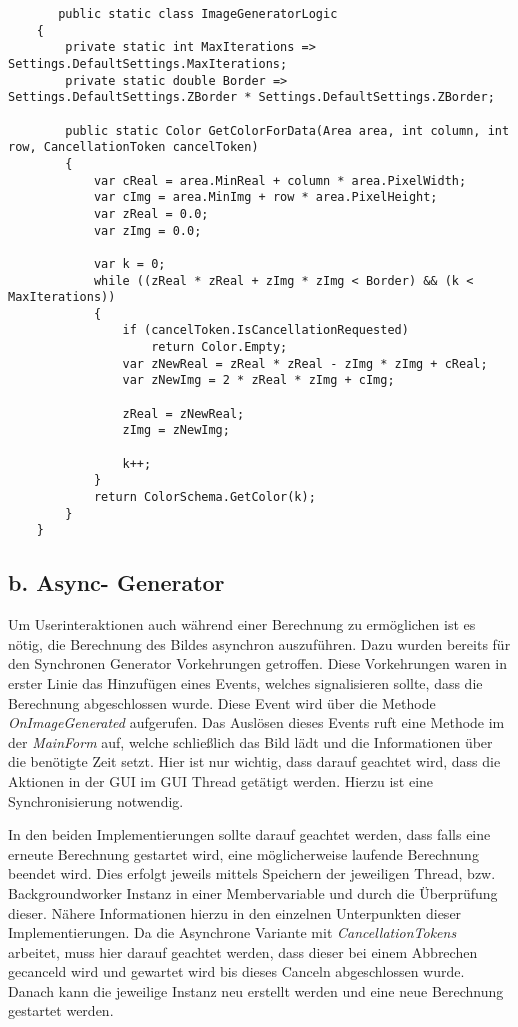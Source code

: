 \documentclass[a4paper,ngerman]{scrartcl}
\begin{document}
\begin{lstlisting}
       public static class ImageGeneratorLogic
    {
        private static int MaxIterations => Settings.DefaultSettings.MaxIterations;
        private static double Border => Settings.DefaultSettings.ZBorder * Settings.DefaultSettings.ZBorder;

        public static Color GetColorForData(Area area, int column, int row, CancellationToken cancelToken)
        {
            var cReal = area.MinReal + column * area.PixelWidth;
            var cImg = area.MinImg + row * area.PixelHeight;
            var zReal = 0.0;
            var zImg = 0.0;

            var k = 0;
            while ((zReal * zReal + zImg * zImg < Border) && (k < MaxIterations))
            {
                if (cancelToken.IsCancellationRequested)
                    return Color.Empty;
                var zNewReal = zReal * zReal - zImg * zImg + cReal;
                var zNewImg = 2 * zReal * zImg + cImg;

                zReal = zNewReal;
                zImg = zNewImg;

                k++;
            }
            return ColorSchema.GetColor(k);
        }
    }
\end{lstlisting}

\subsection{b. Async- Generator}
Um Userinteraktionen auch während einer Berechnung zu ermöglichen ist es nötig, die Berechnung des Bildes asynchron auszuführen. Dazu wurden bereits für den Synchronen Generator Vorkehrungen getroffen. 
Diese Vorkehrungen waren in erster Linie das Hinzufügen eines Events, welches signalisieren sollte, dass die Berechnung abgeschlossen wurde. Diese Event wird über die Methode \textit{OnImageGenerated} aufgerufen. Das Auslösen dieses Events ruft eine Methode im der \textit{MainForm} auf, welche schließlich das Bild lädt und die Informationen über die benötigte Zeit setzt. Hier ist nur wichtig, dass darauf geachtet wird, dass die Aktionen in der GUI im GUI Thread getätigt werden. Hierzu ist eine Synchronisierung notwendig. 

In den beiden Implementierungen sollte darauf geachtet werden, dass falls eine erneute Berechnung gestartet wird, eine möglicherweise laufende Berechnung beendet wird. Dies erfolgt jeweils mittels Speichern der jeweiligen Thread, bzw. Backgroundworker Instanz in einer Membervariable und durch die Überprüfung dieser. Nähere Informationen hierzu in den einzelnen Unterpunkten dieser Implementierungen. Da die Asynchrone Variante mit \textit{CancellationTokens} arbeitet, muss hier darauf geachtet werden, dass dieser bei einem Abbrechen gecanceld wird und gewartet wird bis dieses Canceln abgeschlossen wurde.  Danach kann die jeweilige Instanz neu erstellt werden und eine neue Berechnung gestartet werden.
\end{document}
